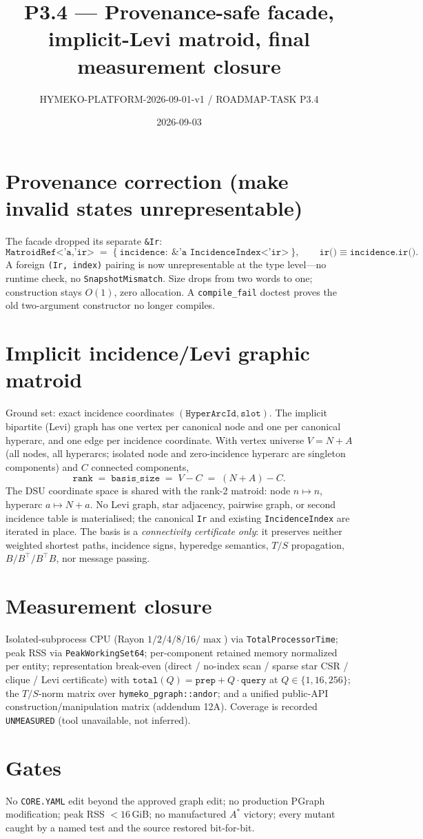 \documentclass[11pt]{article}
\title{P3.4 --- Provenance-safe facade, implicit-Levi matroid, final measurement closure}
\author{HYMEKO-PLATFORM-2026-09-01-v1 / ROADMAP-TASK P3.4}
\date{2026-09-03}
\begin{document}
\maketitle

\section*{Provenance correction (make invalid states unrepresentable)}
The facade dropped its separate \texttt{\&Ir}:
\[
\texttt{MatroidRef<'a,'ir>}\;=\;\{\ \texttt{incidence}:\ \texttt{\&'a IncidenceIndex<'ir>}\ \},
\qquad \texttt{ir()} \equiv \texttt{incidence.ir()}.
\]
A foreign \texttt{(Ir, index)} pairing is now unrepresentable at the type level---no runtime check,
no \texttt{SnapshotMismatch}. Size drops from two words to one; construction stays $O(1)$, zero
allocation. A \texttt{compile\_fail} doctest proves the old two-argument constructor no longer
compiles.

\section*{Implicit incidence/Levi graphic matroid}
Ground set: exact incidence coordinates $(\texttt{HyperArcId}, \texttt{slot})$. The implicit
bipartite (Levi) graph has one vertex per canonical node and one per canonical hyperarc, and one
edge per incidence coordinate. With vertex universe $V = N + A$ (all nodes, all hyperarcs; isolated
node and zero-incidence hyperarc are singleton components) and $C$ connected components,
\[
\texttt{rank} \;=\; \texttt{basis\_size} \;=\; V - C \;=\; (N + A) - C .
\]
The DSU coordinate space is shared with the rank-2 matroid: node $n \mapsto n$, hyperarc
$a \mapsto N + a$. No Levi graph, star adjacency, pairwise graph, or second incidence table is
materialised; the canonical \texttt{Ir} and existing \texttt{IncidenceIndex} are iterated in place.
The basis is a \emph{connectivity certificate only}: it preserves neither weighted shortest paths,
incidence signs, hyperedge semantics, $T/S$ propagation, $B/B^{\top}/B^{\top}B$, nor message passing.

\section*{Measurement closure}
Isolated-subprocess CPU (Rayon $1/2/4/8/16/\max$) via \texttt{TotalProcessorTime}; peak RSS via
\texttt{PeakWorkingSet64}; per-component retained memory normalized per entity; representation
break-even (direct / no-index scan / sparse star CSR / clique / Levi certificate) with
$\texttt{total}(Q) = \texttt{prep} + Q\cdot\texttt{query}$ at $Q\in\{1,16,256\}$; the $T/S$-norm
matrix over \texttt{hymeko\_pgraph::andor}; and a unified public-API construction/manipulation matrix
(addendum 12A). Coverage is recorded \texttt{UNMEASURED} (tool unavailable, not inferred).

\section*{Gates}
No \texttt{CORE.YAML} edit beyond the approved graph edit; no production PGraph modification; peak RSS
$<16$\,GiB; no manufactured $A^\ast$ victory; every mutant caught by a named test and the source
restored bit-for-bit.
\end{document}
